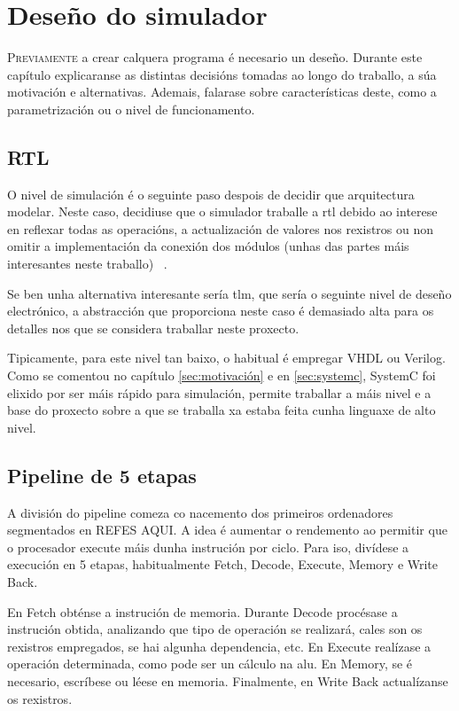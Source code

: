 \chapter{Deseño do simulador}
\label{chap:deseño_simulador}

\lettrine{P}{reviamente} a crear calquera programa é necesario un deseño. Durante este capítulo explicaranse as distintas decisións tomadas ao longo do traballo, a súa motivación e alternativas. Ademais, falarase sobre características deste, como a parametrización ou o nivel de funcionamento.

\section{RTL}\label{sec:rtl}
O nivel de simulación é o seguinte paso despois de decidir que arquitectura modelar. Neste caso, decidiuse que o simulador traballe a \acrfull{rtl} debido ao interese en reflexar todas as operacións, a actualización de valores nos rexistros ou non omitir a implementación da conexión dos módulos (unhas das partes máis interesantes neste traballo) ~\cite{rtl_wikipedia}.

Se ben unha alternativa interesante sería \acrfull{tlm}, que sería o seguinte nivel de deseño electrónico, a abstracción que proporciona neste caso é demasiado alta para os detalles nos que se considera traballar neste proxecto.  

Tipicamente, para este nivel tan baixo, o habitual é empregar VHDL ou Verilog. Como se comentou no capítulo \ref{sec:motivación} e en \ref{sec:systemc}, SystemC foi elixido por ser máis rápido para simulación, permite traballar a máis nivel e a base do proxecto sobre a que se traballa xa estaba feita cunha linguaxe de alto nivel.

\section{Pipeline de 5 etapas}\label{sec:pipeline_5etapas}
A división do pipeline comeza co nacemento dos primeiros ordenadores segmentados en REFES AQUI. A idea é aumentar o rendemento ao permitir que o procesador execute máis dunha instrución por ciclo. Para iso, divídese a execución en 5 etapas, habitualmente Fetch, Decode, Execute, Memory e Write Back.

En Fetch obténse a instrución de memoria. Durante Decode procésase a instrución obtida, analizando que tipo de operación se realizará, cales son os rexistros empregados, se hai algunha dependencia, etc. En Execute realízase a operación determinada, como pode ser un cálculo na \acrfull{alu}. En Memory, se é necesario, escríbese ou léese en memoria. Finalmente, en Write Back actualízanse os rexistros.

